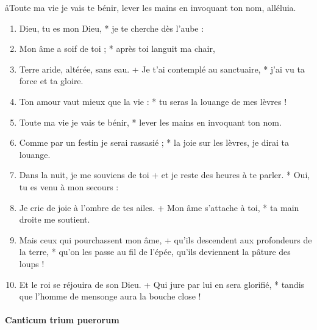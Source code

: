 \documentclass[twoside]{article}
\begin{document}
\begin{paracol}[1]{2}
\aa Toute ma vie je vais te bénir,
lever les mains en invoquant ton nom, alléluia.


\begin{enumerate}[wide, itemsep=0mm, labelwidth=!, labelindent=0pt, label=\color{gregoriocolor}\theenumi]

\item Dieu, tu es mon Dieu, *
je te cherche dès l’aube :
   
\item Mon âme a soif de toi ; *
après toi languit ma chair,

\item Terre aride, altérée, sans eau. +
Je t’ai contemplé au sanctuaire, *
j’ai vu ta force et ta gloire.

\item Ton amour vaut mieux que la vie : *
tu seras la louange de mes lèvres !

\item Toute ma vie je vais te bénir, *
lever les mains en invoquant ton nom.

\item Comme par un festin je serai rassasié ; *
la joie sur les lèvres, je dirai ta louange.

\item Dans la nuit, je me souviens de toi +
et je reste des heures à te parler. *
Oui, tu es venu à mon secours :

\item Je crie de joie à l’ombre de tes ailes. +
Mon âme s’attache à toi, *
ta main droite me soutient.

\item Mais ceux qui pourchassent mon âme, +
qu'ils descendent aux profondeurs de la terre, *
qu'on les passe au fil de l'épée, qu'ils deviennent la pâture des loups !

\item Et le roi se réjouira de son Dieu. +
Qui jure par lui en sera glorifié, *
tandis que l'homme de mensonge aura la bouche close !


\end{enumerate}

\switchcolumn*
\paragraph{Canticum trium puerorum}




\end{paracol}
\end{document}
